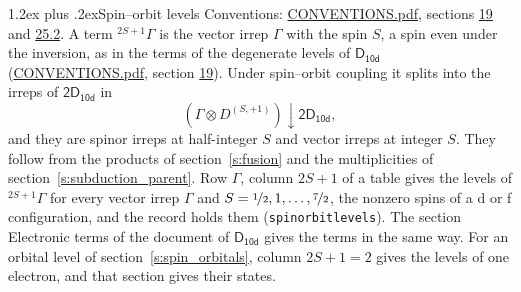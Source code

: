 \documentclass[10pt,a4paper]{article}
\makeatletter
\renewcommand\section{\@startsection{section}{1}{\z@}{-3ex plus -1ex minus -.2ex}%
  {1.2ex plus .2ex}{\normalfont\large\sffamily\bfseries\color{parttitle}}}
\numberwithin{equation}{section}
\newcommand{\grp}[1]{\mathsf{#1}}
\newcommand{\restr}[2]{#1\!\downarrow#2}
\newcommand{\irrJp}[2]{D^{(#1,#2)}}
\newcommand{\irrprod}{\otimes}
\newcommand{\term}[2]{{}^{#1}#2}
\makeatother
\begin{document}
\section{Spin--orbit levels}\label{s:spin_orbit}
Conventions: \href{../../CONVENTIONS.pdf}{CONVENTIONS.pdf}, sections \href{../../../rotation/CONVENTIONS.pdf\#conv.19}{19} and \href{../../CONVENTIONS.pdf\#conv.25.2}{25.2}.
\leavevmode\label{n:local.spin}\label{n:symbol.term}A term $\term{2S+1}{\Gamma}$ is the vector irrep $\Gamma$ with the spin $S$, a spin even under the inversion, as in the terms of the degenerate levels of \href{../../../rotation/data/pdf/D10d.pdf}{$\grp{D_{10d}}$} (\href{../../CONVENTIONS.pdf}{CONVENTIONS.pdf}, section \href{../../../rotation/CONVENTIONS.pdf\#conv.19}{19}). Under spin--orbit coupling it splits into the irreps of $\grp{2D_{10d}}$ in
\begin{equation}\label{e:spinorbit}\restr{(\Gamma \irrprod \irrJp{S}{+1})}{\grp{2D_{10d}}},\end{equation}
and they are spinor irreps at half-integer $S$ and vector irreps at integer $S$. They follow from the products of section~\ref{s:fusion} and the multiplicities of section~\ref{s:subduction_parent}. Row $\Gamma$, column $2S + 1$ of a table gives the levels of $\term{2S+1}{\Gamma}$ for every vector irrep $\Gamma$ and $S = \nicefrac{1}{2}, 1, \dots, \nicefrac{7}{2}$, the nonzero spins of a d or f configuration, and the record holds them (\texttt{spinorbitlevels}). The section Electronic terms of the document of \href{../../../rotation/data/pdf/D10d.pdf}{$\grp{D_{10d}}$} gives the terms in the same way. For an orbital level of section~\ref{s:spin_orbitals}, column $2S + 1 = 2$ gives the levels of one electron, and that section gives their states.
\end{document}
